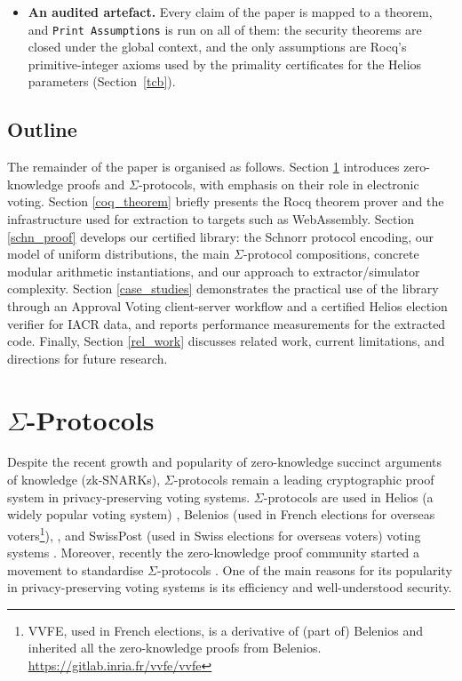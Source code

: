 \documentclass[sigconf,anonymous,review]{acmart}
\begin{document}
\begin{itemize}
  \item \textbf{An audited artefact.} Every claim of the paper is mapped to a theorem, and \texttt{Print Assumptions} is run on all of them: the security theorems are closed under the global context, and the only assumptions are Rocq's primitive-integer axioms used by the primality certificates for the Helios parameters (Section~\ref{tcb}).
\end{itemize}

\subsection{Outline}
The remainder of the paper is organised as follows. 
Section \ref{sigma_protocol} introduces zero-knowledge proofs and $\Sigma$-protocols, with emphasis on their role in electronic voting. 
Section \ref{coq_theorem} briefly presents the Rocq theorem prover and the infrastructure used for extraction to targets such as WebAssembly. 
Section \ref{schn_proof} develops our certified library: the Schnorr protocol encoding, our model of uniform distributions, the main $\Sigma$-protocol compositions, concrete modular arithmetic instantiations, and our approach to extractor/simulator complexity. 
Section \ref{case_studies} demonstrates the practical use of the library through an Approval Voting client-server workflow and a certified Helios election verifier for IACR data, and reports performance measurements for the extracted code. Finally, Section \ref{rel_work} discusses related work, current limitations, and directions for future research.



\section{$\Sigma$-Protocols}\label{sigma_protocol}
Despite the recent growth and popularity of zero-knowledge succinct 
arguments of knowledge (zk-SNARKs), $\Sigma$-protocols remain a
leading cryptographic proof system in privacy-preserving voting systems. 
$\Sigma$-protocols are used in Helios (a widely popular voting system) \cite{adida2008helios}, 
Belenios (used in French elections for overseas 
voters\footnote{VVFE, used in French elections, is a derivative of (part of) Belenios and 
inherited all the zero-knowledge proofs from Belenios. \url{https://gitlab.inria.fr/vvfe/vvfe}}), \cite{cortier2023french}, and 
SwissPost (used in Swiss elections for overseas voters) voting 
systems \cite{10.1007/978-3-031-15911-4_4}. 
Moreover, recently the zero-knowledge proof community started a movement to standardise
$\Sigma$-protocols \cite{ZKProof}.
One of the main reasons for its popularity in privacy-preserving voting systems is its
efficiency and well-understood security.
\end{document}
